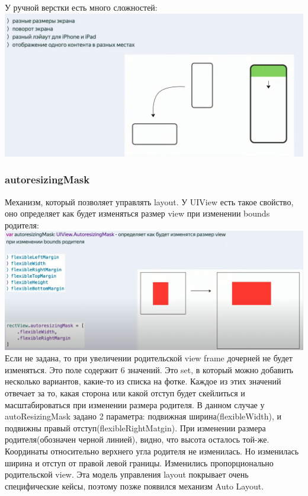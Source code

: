 \documentclass{article}
\begin{document}
    \newline
    У ручной верстки есть много сложностей: 
    \newline
    \includegraphics[scale = 0.2]{pic/Снимок экрана 2023-07-31 в 21.29.56.png}
    \newline
    \subsubsection{autoresizingMask}
    Механизм, который позволяет управлять layout. У UIView есть такое свойство, оно определяет как будет изменяться размер view при изменении bounds родителя:
    \newline
    \includegraphics[scale = 0.3]{pic/Снимок экрана 2023-07-31 в 21.34.01.png}
    \newline
    Если  не задана, то при увеличении родительской view frame дочерней не будет изменяться. Это поле содержит 6 значений. Это set, в который можно добавить несколько вариантов, какие-то из списка на фотке. Каждое из этих значений отвечает за то, какая сторона или какой отступ будет скейлиться и масштабироваться при изменении размера родителя. 
    \newline
    В данном случае у autoResizingMask задано 2 параметра: подвижная ширина(flexibleWidth), и подвижны правый отступ(flexibleRightMatgin). При изменении размера родителя(обозначен черной линией), видно, что высота осталось той-же. Координаты относительно верхнего угла родителя не изменилась. Но изменилась ширина и отступ от правой левой границы. Изменились пропорционально родительской view. Эта модель управления layout покрывает очень специфические кейсы, поэтому позже появился механизм Auto Layout. 
\end{document}
